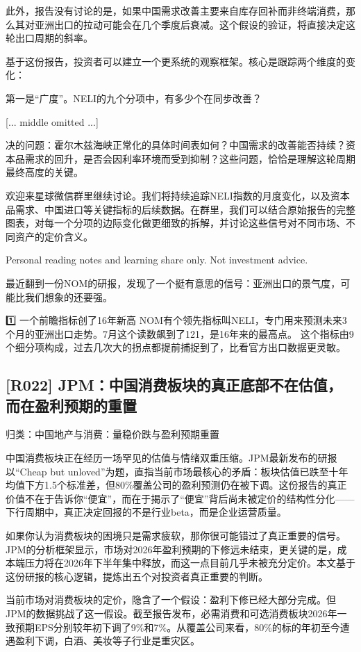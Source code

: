 \documentclass[11pt]{ctexart}
\begin{document}
此外，报告没有讨论的是，如果中国需求改善主要来自库存回补而非终端消费，那么其对亚洲出口的拉动可能会在几个季度后衰减。这个假设的验证，将直接决定这轮出口周期的斜率。

基于这份报告，投资者可以建立一个更系统的观察框架。核心是跟踪两个维度的变化：

第一是“广度”。NELI的九个分项中，有多少个在同步改善？

[... middle omitted ...]

决的问题：霍尔木兹海峡正常化的具体时间表如何？中国需求的改善能否持续？资本品需求的回升，是否会因利率环境而受到抑制？这些问题，恰恰是理解这轮周期最终高度的关键。

欢迎来星球微信群里继续讨论。我们将持续追踪NELI指数的月度变化，以及资本品需求、中国进口等关键指标的后续数据。在群里，我们可以结合原始报告的完整图表，对每一个分项的边际变化做更细致的拆解，并讨论这些信号对不同市场、不同资产的定价含义。

Personal reading notes and learning share only. Not investment advice.

最近翻到一份NOM的研报，发现了一个挺有意思的信号：亚洲出口的景气度，可能比我们想象的还要强。

1️⃣ 一个前瞻指标创了16年新高 NOM有个领先指标叫NELI，专门用来预测未来3个月的亚洲出口走势。7月这个读数飙到了121，是16年来的最高点。 这个指标由9个细分项构成，过去几次大的拐点都提前捕捉到了，比看官方出口数据更灵敏。

\subsection{[R022] JPM：中国消费板块的真正底部不在估值，而在盈利预期的重置}
{\small\color{refgray}归类：中国地产与消费：量稳价跌与盈利预期重置}

中国消费板块正在经历一场罕见的估值与情绪双重压缩。JPM最新发布的研报以“Cheap but unloved”为题，直指当前市场最核心的矛盾：板块估值已跌至十年均值下方1.5个标准差，但80\%覆盖公司的盈利预测仍在被下调。这份报告的真正价值不在于告诉你“便宜”，而在于揭示了“便宜”背后尚未被定价的结构性分化——下行周期中，真正决定回报的不是行业beta，而是企业运营质量。

如果你认为消费板块的困境只是需求疲软，那你很可能错过了真正重要的信号。JPM的分析框架显示，市场对2026年盈利预期的下修远未结束，更关键的是，成本端压力将在2026年下半年集中释放，而这一点目前几乎未被充分定价。本文基于这份研报的核心逻辑，提炼出五个对投资者真正重要的判断。

当前市场对消费板块的定价，隐含了一个假设：盈利下修已经大部分完成。但JPM的数据挑战了这一假设。截至报告发布，必需消费和可选消费板块2026年一致预期EPS分别较年初下调了9\%和7\%。从覆盖公司来看，80\%的标的年初至今遭遇盈利下调，白酒、美妆等子行业是重灾区。
\end{document}
